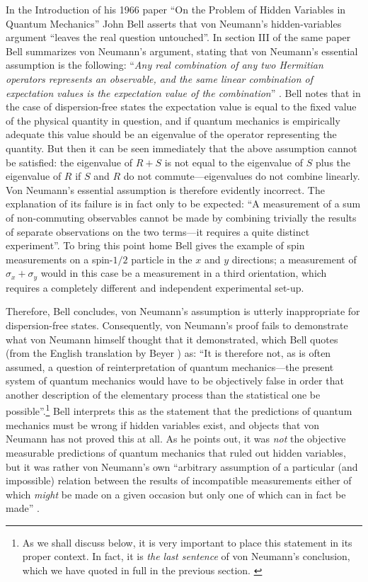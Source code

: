 \documentclass[12pt]{article}
\begin{document}
In the Introduction of his 1966 paper ``On the Problem of Hidden Variables in Quantum Mechanics'' \cite{bell66} John Bell asserts that von Neumann's hidden-variables argument ``leaves the real question untouched''. In section III of the same paper Bell summarizes von Neumann's argument, stating that von Neumann's essential assumption is the following: ``\emph{Any real combination of any two Hermitian operators represents an observable, and the same linear combination of expectation values is the expectation value of the combination}'' \cite[pp.\@ 448--449]{bell66}. Bell notes that in the case of dispersion-free states the expectation value is equal to the fixed value of the physical quantity in question, and if quantum mechanics is empirically adequate this value should be an eigenvalue of the operator representing the quantity. But then it can be seen immediately that the above assumption cannot be satisfied: the eigenvalue of $R + S$ is not equal to the eigenvalue of $S$ plus the eigenvalue of $R$ if $S$ and $R$ do not commute---eigenvalues do not combine linearly. Von Neumann's essential assumption is therefore evidently incorrect. The explanation of its failure is in fact only to be expected: ``A measurement of a sum of non-commuting observables cannot be made by combining trivially the results of separate observations on the two terms---it requires a quite distinct experiment''. To bring this point home Bell gives the example of spin measurements on a spin-$1/2$ particle in the $x$ and $y$ directions; a measurement of $\sigma_x + \sigma_y $ would in this case be a measurement in a third orientation, which requires a completely different and independent experimental set-up.

Therefore, Bell concludes, von Neumann's assumption is utterly inappropriate for dispersion-free states. Consequently, von Neumann's proof fails to demonstrate what von Neumann himself thought that it demonstrated, which Bell quotes (from the English translation by Beyer \cite{VN1}) as: ``It is therefore not, as is often assumed, a question of reinterpretation of quantum mechanics---the present system of quantum mechanics would have to be objectively false in order that another description of the elementary process than the statistical one be possible''.\footnote{As we shall discuss below, it is very important to place this statement in its proper context. In fact, it is \emph{the last sentence} of von Neumann's conclusion, which we have quoted in full in the previous section. \label{Note}} Bell interprets this as the statement that the predictions of quantum mechanics must be wrong if hidden variables exist, and objects that von Neumann has not proved this at all. As he points out, it was \emph{not} the objective measurable predictions of quantum mechanics that ruled out hidden variables, but it was rather von Neumann's own ``arbitrary assumption of a particular (and impossible) relation between the results of incompatible measurements either of which \emph{might} be made on a given occasion but only one of which can in fact be made'' \cite[p.\@ 449]{bell66}.
\end{document}
